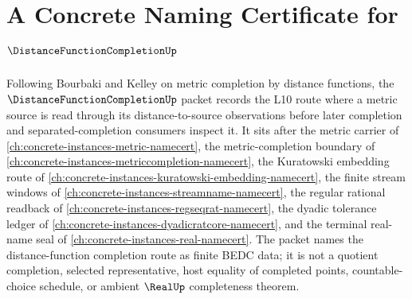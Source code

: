 \chapter{A Concrete Naming Certificate for $\DistanceFunctionCompletionUp$}
\label{ch:concrete-instances-distance-function-completion-namecert}

Following Bourbaki and Kelley on metric completion by distance functions, the $\DistanceFunctionCompletionUp$ packet records the L10 route where a metric source is read through its distance-to-source observations before later completion and separated-completion consumers inspect it. It sits after the metric carrier of \autoref{ch:concrete-instances-metric-namecert}, the metric-completion boundary of \autoref{ch:concrete-instances-metriccompletion-namecert}, the Kuratowski embedding route of \autoref{ch:concrete-instances-kuratowski-embedding-namecert}, the finite stream windows of \autoref{ch:concrete-instances-streamname-namecert}, the regular rational readback of \autoref{ch:concrete-instances-regseqrat-namecert}, the dyadic tolerance ledger of \autoref{ch:concrete-instances-dyadicratcore-namecert}, and the terminal real-name seal of \autoref{ch:concrete-instances-real-namecert}. The packet names the distance-function completion route as finite BEDC data; it is not a quotient completion, selected representative, host equality of completed points, countable-choice schedule, or ambient $\RealUp$ completeness theorem.

